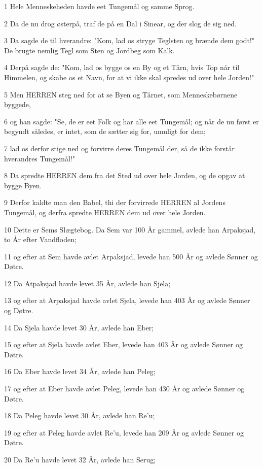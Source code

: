\par 1 Hele Menneskeheden havde eet Tungemål og samme Sprog.
\par 2 Da de nu drog østerpå, traf de på en Dal i Sinear, og der slog de sig ned.
\par 3 Da sagde de til hverandre: "Kom, lad os stryge Teglsten og brænde dem godt!" De brugte nemlig Tegl som Sten og Jordbeg som Kalk.
\par 4 Derpå sagde de: "Kom, lad os bygge os en By og et Tårn, hvis Top når til Himmelen, og skabe os et Navn, for at vi ikke skal spredes ud over hele Jorden!"
\par 5 Men HERREN steg ned for at se Byen og Tårnet, som Menneskebørnene byggede,
\par 6 og han sagde: "Se, de er eet Folk og har alle eet Tungemål; og når de nu først er begyndt således, er intet, som de sætter sig for, umuligt for dem;
\par 7 lad os derfor stige ned og forvirre deres Tungemål der, så de ikke forstår hverandres Tungemål!"
\par 8 Da spredte HERREN dem fra det Sted ud over hele Jorden, og de opgav at bygge Byen.
\par 9 Derfor kaldte man den Babel, thi der forvirrede HERREN al Jordens Tungemål, og derfra spredte HERREN dem ud over hele Jorden.
\par 10 Dette er Sems Slægtebog. Da Sem var 100 År gammel, avlede han Arpaksjad, to År efter Vandfloden;
\par 11 og efter at Sem havde avlet Arpaksjad, levede han 500 År og avlede Sønner og Døtre.
\par 12 Da Atpaksjad havde levet 35 År, avlede han Sjela;
\par 13 og efter at Arpaksjad havde avlet Sjela, levede han 403 År og avlede Sønner og Døtre.
\par 14 Da Sjela havde levet 30 År, avlede han Eber;
\par 15 og efter at Sjela havde avlet Eber, levede han 403 År og avlede Sønner og Døtre.
\par 16 Da Eber havde levet 34 År, avlede han Peleg;
\par 17 og efter at Eber havde avlet Peleg, levede han 430 År og avlede Sønner og Døtre.
\par 18 Da Peleg havde levet 30 År, avlede han Re'u;
\par 19 og efter at Peleg havde avlet Re'u, levede han 209 År og avlede Sønner og Døtre.
\par 20 Da Re'u havde levet 32 År, avlede han Serug;
